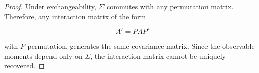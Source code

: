 \documentclass[10pt,a4paper]{amsart}
\begin{document}
\begin{proof}
Under exchangeability, $\Sigma$ commutes with any permutation matrix.
Therefore, any interaction matrix of the form

\begin{equation}
A'
=
P A P'
\label{eq:4.permutation}
\end{equation}

with $P$ permutation, generates the same covariance matrix.
Since the observable moments depend only on $\Sigma$, the interaction
matrix cannot be uniquely recovered.
\end{proof}
\end{document}
